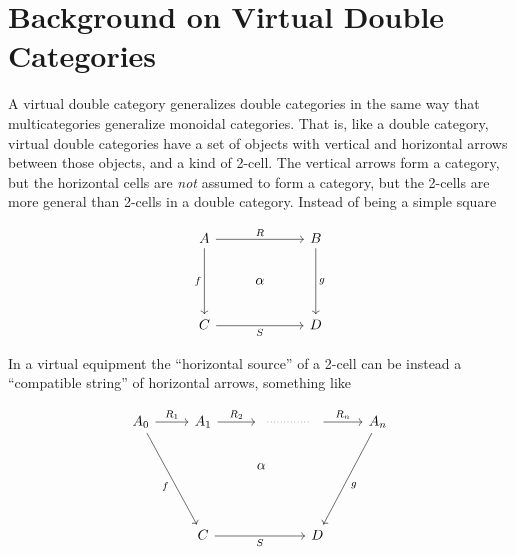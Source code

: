 \documentclass{article}
\begin{document}
\section{Background on Virtual Double Categories}

A virtual double category generalizes double categories in the same
way that multicategories generalize monoidal categories. That is, like
a double category, virtual double categories have a set of objects
with vertical and horizontal arrows between those objects, and a kind
of 2-cell. The vertical arrows form a category, but the horizontal
cells are \emph{not} assumed to form a category, but the 2-cells are
more general than 2-cells in a double category. Instead of being a
simple square

\[\begin{tikzcd}
A \arrow[dd, "f"'] \arrow[rr, "R"] &        & B \arrow[dd, "g"] \\
                                   & \alpha &                   \\
C \arrow[rr, "S"']                 &        & D                
\end{tikzcd}\]

In a virtual equipment the ``horizontal source'' of a 2-cell can be
instead a ``compatible string'' of horizontal arrows, something like

\[%
\begin{tikzcd}
A_0 \arrow[rddd, "f"'] \arrow[r, "R_1"] & A_1 \arrow[r, "R_2"] & {} \arrow[r, no head, dotted] & {} \arrow[r, "R_n"] & A_n \arrow[lddd, "g"] \\
                                        &                      & \alpha                        &                     &                       \\
                                        &                      &                               &                     &                       \\
                                        & C \arrow[rr, "S"']   &                               & D                   &                      
\end{tikzcd}\]
\end{document}
